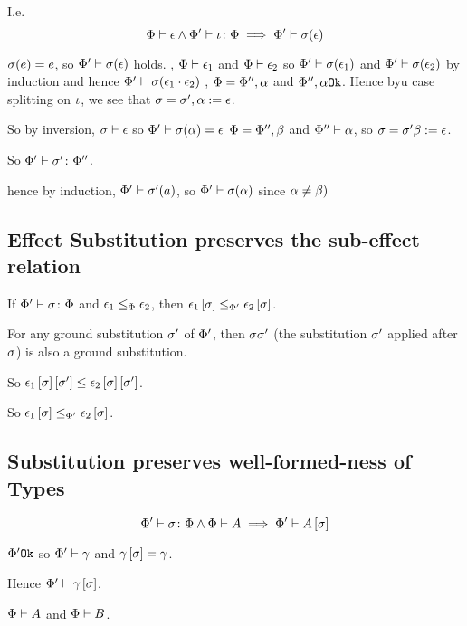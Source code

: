 {I.e. \begin{equation}
    \wellformed{\P}{\e}\wedge\typerelation{\P'}{\i}{\P} \implies \wellformed{\P'}{\si(\e)}
\end{equation}

\proof
{}
$\si(e) = e$, so $\wellformed{\P'}{\si(\e)}$ holds.
\bi, $\wellformed{\P}{\e_1}$ and $\wellformed{\P}{\e_2}$ so $\wellformed{\P'}{\si(\e_1)}$ and $\wellformed{\P'}{\si(\e_2)}$ by induction and hence $\wellformed{\P'}{\si(\e_1\dot\e_2)}$
\bi, $\P=\P'',\a$ and $\ok{\P'',\a}$. Hence byu case splitting on $\i$, we see that $\si=\si', \a\setto\e$.

So by inversion, $\wellformed{\si}{\e}$ so $\wellformed{\P'}{\si(\a)=\e}$
\bi $\P=\P'', \b$ and $\wellformed{\P''}{\a}$, so $\si=\si'\b\setto\e$.

So $\typerelation{\P'}{\si'}{\P''}$.

hence by induction, $\wellformed{\P'}{\si'(a)}$, so $\wellformed{\P'}{\si(\a)}$ since $\a\neq\b)$

\subsection{Effect Substitution preserves the sub-effect relation}

If $\typerelation{\P'}{\si}{\P}$ and $\e_1\subeffectp\e_2$, then $\e_1\ssi\subeffect_{\P'}\e_2\ssi$.

\proof
For any ground substitution $\si'$ of $\P'$, then $\si\si'$ (the substitution $\si'$ applied after $\si$) is also a ground substitution.

So $\e_1\ssi\sub{\si'}\subeffect\e_2\ssi\sub{\si'}$. 

So $\e_1\ssi\subeffect_{\P'}\e_2\ssi$.

\subsection{Substitution preserves well-formed-ness of Types}
\begin{equation}
    \typerelation{\P'}{\si}{\P} \wedge \wellformed{\P}{A} \implies \wellformed{\P'}{A\ssi}
\end{equation}
\proof
{}

$\ok{\P'}$ so $\wellformed{\P'}{\g}$ and $\g\ssi=\g$.

Hence $\wellformed{\P'}{\g\ssi}$.


\bi $\wellformed{\P}{A}$ and $\wellformed{\P}{B}$.

}
